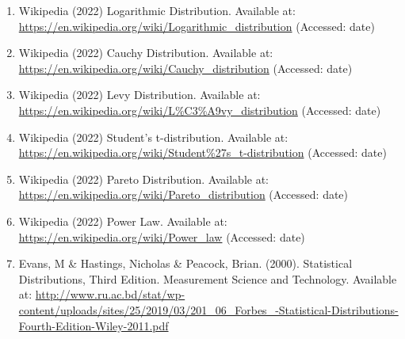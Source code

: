 \documentclass[14pt, a4paper]{article}
\theoremstyle{definition}
\begin{document}
\begin{enumerate}
    \item Wikipedia (2022) Logarithmic Distribution. Available at: \url{https://en.wikipedia.org/wiki/Logarithmic_distribution} (Accessed: date)
    \item Wikipedia (2022) Cauchy Distribution. Available at: \url{https://en.wikipedia.org/wiki/Cauchy_distribution} (Accessed: date)
    \item Wikipedia (2022) Levy Distribution. Available at: \url{https://en.wikipedia.org/wiki/L%C3%A9vy_distribution} (Accessed: date)
    \item Wikipedia (2022) Student's t-distribution. Available at: \url{https://en.wikipedia.org/wiki/Student%27s_t-distribution} (Accessed: date)
    \item Wikipedia (2022) Pareto Distribution. Available at: \url{https://en.wikipedia.org/wiki/Pareto_distribution} (Accessed: date)
    \item Wikipedia (2022) Power Law. Available at: \url{https://en.wikipedia.org/wiki/Power_law} (Accessed: date) 
    \item Evans, M & Hastings, Nicholas & Peacock, Brian. (2000). Statistical Distributions, Third Edition. Measurement Science and Technology. Available at: \url{http://www.ru.ac.bd/stat/wp-content/uploads/sites/25/2019/03/201_06_Forbes_-Statistical-Distributions-Fourth-Edition-Wiley-2011.pdf}  
    
\end{enumerate}






 
\end{document}
